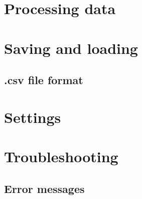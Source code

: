 \documentclass[11pt,letterpaper,article]{memoir}
\begin{document}
\section{Processing data}

\section{Saving and loading}
\subsection{.csv file format}
\label{sec:savingloading}

\section{Settings}

\section{Troubleshooting}

\subsection{Error messages}
\end{document}
